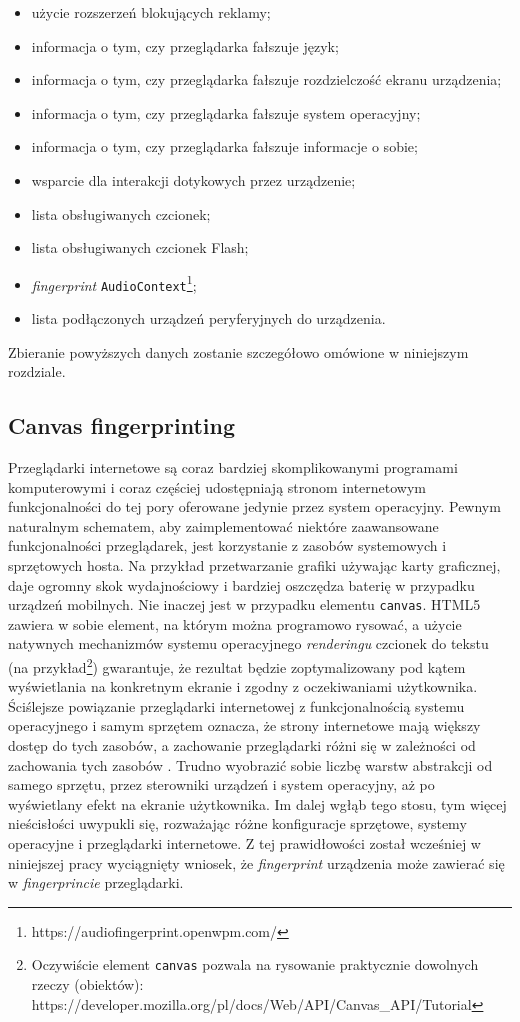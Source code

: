 \begin{itemize}
	\item użycie rozszerzeń blokujących reklamy;
	\item informacja o tym, czy przeglądarka fałszuje język;
	\item informacja o tym, czy przeglądarka fałszuje rozdzielczość ekranu
	      urządzenia;
	\item informacja o tym, czy przeglądarka fałszuje system operacyjny;
	\item informacja o tym, czy przeglądarka fałszuje informacje o sobie;
	\item wsparcie dla interakcji dotykowych przez urządzenie;
	\item lista obsługiwanych czcionek;
	\item lista obsługiwanych czcionek Flash;
	\item \emph{fingerprint}
	      \texttt{AudioContext}\footnote{https://audiofingerprint.openwpm.com/};
	\item lista podłączonych urządzeń peryferyjnych do urządzenia.
\end{itemize}

Zbieranie powyższych danych zostanie szczegółowo omówione w niniejszym
rozdziale.

\subsection{Canvas fingerprinting}
Przeglądarki internetowe są coraz bardziej skomplikowanymi programami
komputerowymi i coraz częściej udostępniają stronom internetowym funkcjonalności
do tej pory oferowane jedynie przez system operacyjny. Pewnym naturalnym
schematem, aby zaimplementować niektóre zaawansowane funkcjonalności
przeglądarek, jest korzystanie z zasobów systemowych i sprzętowych hosta. Na
przykład przetwarzanie grafiki używając karty graficznej, daje ogromny skok
wydajnościowy i bardziej oszczędza baterię w przypadku urządzeń mobilnych. Nie
inaczej jest w przypadku elementu \texttt{canvas}. HTML5 zawiera w sobie
element, na którym można programowo rysować, a użycie natywnych mechanizmów
systemu operacyjnego \emph{renderingu} czcionek do tekstu (na
przykład\footnote{Oczywiście element \texttt{canvas} pozwala na rysowanie
	praktycznie dowolnych rzeczy (obiektów):
	https://developer.mozilla.org/pl/docs/Web/API/Canvas\_API/Tutorial})
gwarantuje, że rezultat będzie zoptymalizowany pod kątem wyświetlania na
konkretnym ekranie i zgodny z oczekiwaniami użytkownika. Ściślejsze powiązanie
przeglądarki internetowej z funkcjonalnością systemu operacyjnego i samym
sprzętem oznacza, że strony internetowe mają większy dostęp do tych zasobów, a
zachowanie przeglądarki różni się w zależności od zachowania tych zasobów
\cite[s. 1]{mowery2012pixel}. Trudno wyobrazić sobie liczbę warstw abstrakcji od
samego sprzętu, przez sterowniki urządzeń i system operacyjny, aż po wyświetlany
efekt na ekranie użytkownika. Im dalej wgłąb tego stosu, tym więcej nieścisłości
uwypukli się, rozważając różne konfiguracje sprzętowe, systemy operacyjne i
przeglądarki internetowe. Z tej prawidłowości został wcześniej w niniejszej
pracy wyciągnięty wniosek, że \emph{fingerprint} urządzenia może zawierać się w
\emph{fingerprincie} przeglądarki.

